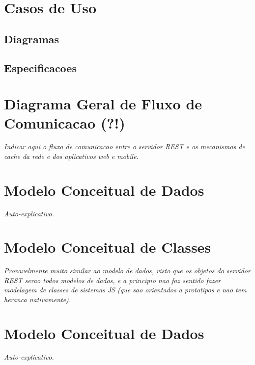 \documentclass[a4paper,article]{abnt}
\begin{document}
\section{Casos de Uso}

\subsection{Diagramas}

\subsection{Especificacoes}

\section{Diagrama Geral de Fluxo de Comunicacao (?!)}
\emph{Indicar aqui o fluxo de comunicacao entre o servidor REST e os mecanismos de cache da rede e dos aplicativos web e mobile.}

\section{Modelo Conceitual de Dados}
\emph{Auto-explicativo.}

\section{Modelo Conceitual de Classes}
\emph{Provavelmente muito similar ao modelo de dados, visto que os objetos do servidor REST serao todos modelos de dados, e a principio nao faz sentido fazer modelagem de classes de sistemas JS (que sao orientados a prototipos e nao tem heranca nativamente).}

\section{Modelo Conceitual de Dados}
\emph{Auto-explicativo.}
\end{document}
